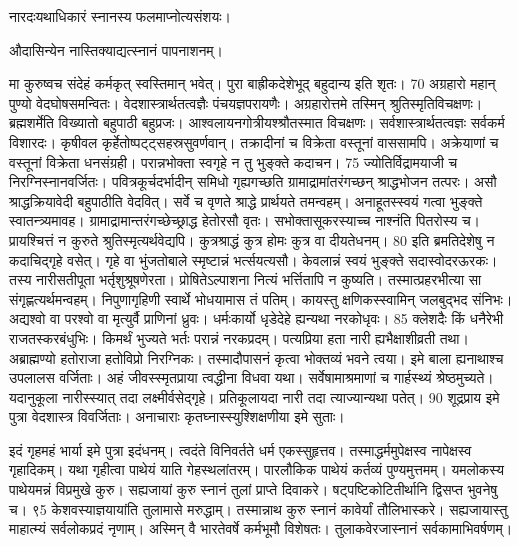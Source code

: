 नारदःयथाधिकारं स्नानस्य फलमाप्नोत्यसंशयः।

औदासिन्येन नास्तिक्याद्यत्स्नानं पापनाशनम्।

मा कुरुष्वच संदेहं कर्मकृत् स्वस्तिमान् भवेत्।
 पुरा बाह्रीकदेशेभूद् बहुदान्य इति शृतः।
 70 अग्रहारो महान् पुण्यो वेदघोषसमन्वितः।
 वेदशास्त्रार्थतत्वज्ञैः पंचयज्ञपरायणैः।
 अग्रहारोत्तमे तस्मिन् श्रुतिस्मृतिविचक्षणः।
 ब्रह्मशर्मेति विख्यातो बहुपाठी बहुप्रजः।
 आश्वलायनगोत्रीयश्श्रौतस्मात विचक्षणः।
 सर्वशास्त्रार्थतत्वज्ञः सर्वकर्म विशारदः।
 कृषीवल कृर्हेतोष्पट्ट्सहस्रसुवर्णवान्।
 तक्रादीनां च विक्रेता वस्तूनां वाससामपि।
 अक्रेयाणां च वस्तूनां विक्रेता धनसंग्रही।
 परान्नभोक्ता स्वगृहे न तु भुङ्क्ते कदाचन।
 75 ज्योतिर्विद्रामयाजी च निरग्निस्नानवर्जितः।
 पवित्रकूर्चदर्भादीन् समिधो गृह्यगच्छति ग्रामाद्रामांतरंगच्छन् श्राद्धभोजन तत्परः।
 असौ श्राद्धक्रियावेदी बहुपाठीति वेदवित्।
 सर्वे च वृणते श्राद्धे प्रार्थयते तमन्वहम्।
 अनाहूतस्स्वयं गत्वा भुङ्क्ते स्वातन्त्र्यमावह।
 ग्रामाद्रामान्तरंगच्छेच्छ्राद्ध हेतोरसौ वृतः।
 सभोक्तासूकरस्याच्च नाश्नंति पितरोस्य च।
 प्रायश्चित्तं न कुरुते श्रुतिस्मृत्यर्थवेद्यपि।
 कुत्रश्राद्धं कुत्र होमः कुत्र वा दीयतेधनम्।
 80
इति ब्रमतिदेशेषु न कदाचिद्गृहे वसेत्।
 गृहे वा भुंजतोबाले स्मृष्टान्नं भर्त्सयत्यसौ।
 केवलान्नं स्वयं भुङ्क्ते सदास्वोदरऊरकः।
 तस्य नारीसतीपूता भर्तृशुश्रूषणेरता।
 प्रोषितेऽल्पाशना नित्यं भर्त्तितापि न कुष्यति।
 तस्मात्प्रहरभीत्या सा संगृह्णत्यर्थमन्वहम्।
 निपुणागृहिणी स्वार्थे भोधयामास तं पतिम्।
 कायस्तु क्षणिकस्स्वामिन् जलबुद्भद संनिभः।
 अद्यश्वो वा परश्वो वा मृत्युर्वै प्राणिनां ध्रुवः।
 धर्मःकार्यो धृडेदेहे ह्यन्यथा नरकोधृवः।
 85 क्लेशदैः किं धनैरेभी राजतस्करबंधुभिः।
 किमर्थं भुज्यते भर्तः परान्नं नरकप्रदम्।
 पत्यप्रिया हता नारी ह्यभैक्षाशीव्रती तथा।
 अब्राह्मण्यो हतोराजा हतोविप्रो निरग्निकः।
 तस्मादौपासनं कृत्वा भोक्तव्यं भवने त्वया।
 इमे बाला ह्यनाथाश्च उपलालस वर्जिताः।
 अहं जीवस्स्मृतप्राया त्वद्धीना विधवा यथा।
 सर्वेषामाश्रमाणां च गार्हस्थ्यं श्रेष्ठमुच्यते।
 यदानुकूला नारीस्स्यात् तदा लक्ष्मीर्वसेद्गृहे।
 प्रतिकूलायदा नारी तदा त्याज्यान्यथा पतेत्।
 90 शूद्रप्राय इमे पुत्रा वेदशास्त्र विवर्जिताः।
 अनाचाराः कृतघ्नास्स्युश्शिक्षणीया इमे सुताः।
 
इदं गृहमहं भार्या इमे पुत्रा इदंधनम्।
 त्वदंते विनिवर्तते धर्म एकस्सुहृत्तव।
 तस्माद्धर्ममुपेक्षस्व नापेक्षस्व गृहादिकम्।
 यथा गृहीत्वा पाथेयं याति गेहस्थलांतरम्।
 पारलौकिक पाथेयं कर्तव्यं पुण्यमुत्तमम्।
 यमलोकस्य पाथेयमन्नं विप्रमुखे कुरु।
 सह्यजायां कुरु स्नानं तुलां प्राप्ते दिवाकरे।
 षट्पष्टिकोटितीर्थानि द्विसप्त भुवनेषु च।
 ९5 केशवस्याज्ञयायांति तुलामासे मरुद्धाम्।
 तस्मान्नाथ कुरु स्नानं कावेर्यां तौलिभास्करे।
 सह्यजायास्तु माहात्म्यं सर्वलोकप्रदं नृणाम्।
 अस्मिन् वै भारतेवर्षे कर्मभूमौ विशेषतः।
 तुलाकवेरजास्नानं सर्वकामाभिवर्षणम्।
 
